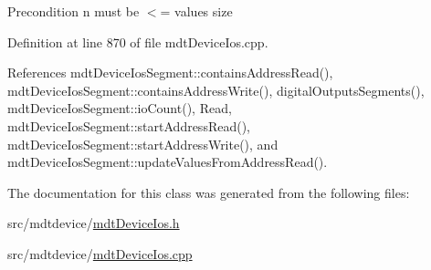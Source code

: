 \begin{DoxyPrecond}{Precondition}
n must be $<$= values size 
\end{DoxyPrecond}


Definition at line 870 of file mdt\-Device\-Ios.\-cpp.



References mdt\-Device\-Ios\-Segment\-::contains\-Address\-Read(), mdt\-Device\-Ios\-Segment\-::contains\-Address\-Write(), digital\-Outputs\-Segments(), mdt\-Device\-Ios\-Segment\-::io\-Count(), Read, mdt\-Device\-Ios\-Segment\-::start\-Address\-Read(), mdt\-Device\-Ios\-Segment\-::start\-Address\-Write(), and mdt\-Device\-Ios\-Segment\-::update\-Values\-From\-Address\-Read().



The documentation for this class was generated from the following files\-:\begin{DoxyCompactItemize}
\item 
src/mdtdevice/\hyperlink{mdt_device_ios_8h}{mdt\-Device\-Ios.\-h}\item 
src/mdtdevice/\hyperlink{mdt_device_ios_8cpp}{mdt\-Device\-Ios.\-cpp}\end{DoxyCompactItemize}
